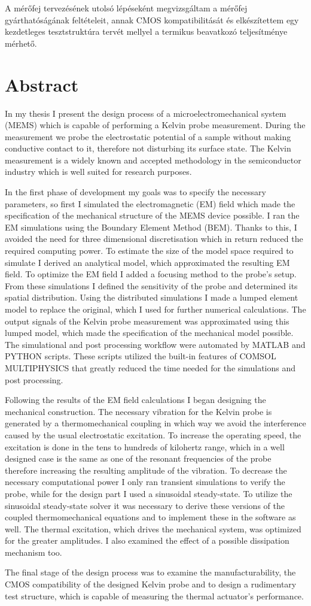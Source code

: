 A mérőfej tervezésének utolsó lépéseként megvizsgáltam a mérőfej gyárthatóságának feltételeit, annak CMOS kompatibilitását és elkészítettem egy kezdetleges tesztstruktúra tervét mellyel a termikus beavatkozó teljesítménye mérhető.

\chapter*{Abstract}

In my thesis I present the design process of a microelectromechanical system (MEMS) which is capable of performing a Kelvin probe measurement. During the measurement we probe the electrostatic potential of a sample without making conductive contact to it, therefore not disturbing its surface state. The Kelvin measurement is a widely known and accepted methodology in the semiconductor industry which is well suited for research purposes.

In the first phase of development my goals was to specify the necessary parameters, so first I simulated the electromagnetic (EM) field which made the specification of the mechanical structure of the MEMS device possible. I ran the EM simulations using the Boundary Element Method (BEM). Thanks to this, I avoided the need for three dimensional discretisation which in return reduced the required computing power. To estimate the size of the model space required to simulate I derived an analytical model, which approximated the resulting EM field. To optimize the EM field I added a focusing method to the probe's setup. From these simulations I defined the sensitivity of the probe and determined its spatial distribution. Using the distributed simulations I made a lumped element model to replace the original, which I used for further numerical calculations. The output signals of the Kelvin probe measurement was approximated using this lumped model, which made the specification of the mechanical model possible. The simulational and post processing workflow were automated by MATLAB and PYTHON scripts. These scripts utilized the built-in features of COMSOL MULTIPHYSICS that greatly reduced the time needed for the simulations and post processing.

Following the results of the EM field calculations I began designing the mechanical construction. The necessary vibration for the Kelvin probe is generated by a thermomechanical coupling in which way we avoid the interference caused by the usual electrostatic excitation. To increase the operating speed, the excitation is done in the tens to hundreds of kilohertz range, which in a well designed case is the same as one of the resonant frequencies of the probe therefore increasing the resulting amplitude of the vibration. To decrease the necessary computational power I only ran transient simulations to verify the probe, while for the design part I used a sinusoidal steady-state. To utilize the sinusoidal steady-state solver it was necessary to derive these versions of the coupled thermomechanical equations and to implement these in the software as well. The thermal excitation, which drives the mechanical system, was optimized for the greater amplitudes. I also examined the effect of a possible dissipation mechanism too.

The final stage of the design process was to examine the manufacturability, the CMOS compatibility of the designed Kelvin probe and to design a rudimentary test structure, which is capable of measuring the thermal actuator's performance.

\vfill
